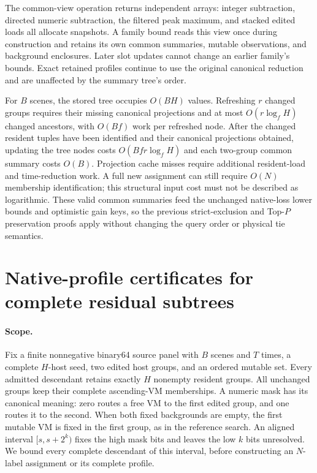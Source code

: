 \documentclass[11pt]{article}
\begin{document}
The common-view operation returns independent arrays: integer subtraction, directed numeric subtraction, the filtered peak maximum, and stacked edited loads all allocate snapshots. A family bound reads this view once during construction and retains its own common summaries, mutable observations, and background enclosures. Later slot updates cannot change an earlier family's bounds. Exact retained profiles continue to use the original canonical reduction and are unaffected by the summary tree's order.

For $B$ scenes, the stored tree occupies $O(BH)$ values. Refreshing $r$ changed groups requires their missing canonical projections and at most $O(r\log_f H)$ changed ancestors, with $O(Bf)$ work per refreshed node. After the changed resident tuples have been identified and their canonical projections obtained, updating the tree nodes costs $O(Bfr\log_f H)$ and each two-group common summary costs $O(B)$. Projection cache misses require additional resident-load and time-reduction work. A full new assignment can still require $O(N)$ membership identification; this structural input cost must not be described as logarithmic. These valid common summaries feed the unchanged native-loss lower bounds and optimistic gain keys, so the previous strict-exclusion and Top-$P$ preservation proofs apply without changing the query order or physical tie semantics.

\section{Native-profile certificates for complete residual subtrees}
\label{sec:family-score-certificates}

\paragraph{Scope.}
Fix a finite nonnegative binary64 source panel with $B$ scenes and $T$ times, a complete $H$-host seed, two edited host groups, and an ordered mutable set. Every admitted descendant retains exactly $H$ nonempty resident groups. All unchanged groups keep their complete ascending-VM memberships.  A numeric mask has its canonical meaning: zero routes a free VM to the first edited group, and one routes it to the second.  When both fixed backgrounds are empty, the first mutable VM is fixed in the first group, as in the reference search. An aligned interval $[s,s+2^k)$ fixes the high mask bits and leaves the low $k$ bits unresolved.  We bound every complete descendant of this interval, before constructing an $N$-label assignment or its complete profile.
\end{document}
